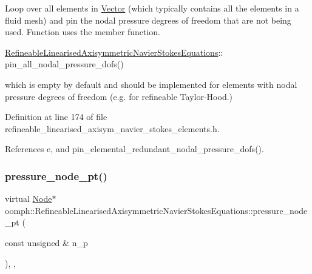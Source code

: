 Loop over all elements in \hyperlink{classoomph_1_1Vector}{Vector} (which typically contains all the elements in a fluid mesh) and pin the nodal pressure degrees of freedom that are not being used. Function uses the member function. 


\begin{DoxyItemize}
\item {\ttfamily \hyperlink{classoomph_1_1RefineableLinearisedAxisymmetricNavierStokesEquations}{Refineable\+Linearised\+Axisymmetric\+Navier\+Stokes\+Equations}\+:}\+: pin\+\_\+all\+\_\+nodal\+\_\+pressure\+\_\+dofs()
\end{DoxyItemize}which is empty by default and should be implemented for elements with nodal pressure degrees of freedom (e.\+g. for refineable Taylor-\/\+Hood.) 

Definition at line 174 of file refineable\+\_\+linearised\+\_\+axisym\+\_\+navier\+\_\+stokes\+\_\+elements.\+h.



References e, and pin\+\_\+elemental\+\_\+redundant\+\_\+nodal\+\_\+pressure\+\_\+dofs().

\mbox{\label{classoomph_1_1RefineableLinearisedAxisymmetricNavierStokesEquations_a2d10829ef102b2877b4a5bb48b6ea770}} 
\subsubsection{\texorpdfstring{pressure\+\_\+node\+\_\+pt()}{pressure\_node\_pt()}}
{\footnotesize\ttfamily virtual \hyperlink{classoomph_1_1Node}{Node}$\ast$ oomph\+::\+Refineable\+Linearised\+Axisymmetric\+Navier\+Stokes\+Equations\+::pressure\+\_\+node\+\_\+pt (\begin{DoxyParamCaption}\item[{const unsigned \&}]{n\+\_\+p }\end{DoxyParamCaption})\hspace{0.3cm}{\ttfamily [inline]}, {\ttfamily [protected]}, {\ttfamily [virtual]}}



